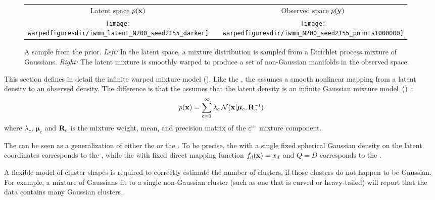 \begin{figure}
\centering
\begin{tabular}{ccc}
Latent space $p({\bf{x}})$ & & Observed space $p({\bf{y}})$ \\
\fbox{\texttt{[image: \\warpedfiguresdir/iwmm\_latent\_N200\_seed2155\_darker]}} &
\raisebox{7em}{$\overset{ \textstyle \vf(\vx)}{ \mathlarger{\mathlarger{\mathlarger{\mathlarger{\mathlarger{ \rightarrow}}}}}}$} &
\fbox{\texttt{[image: \\warpedfiguresdir/iwmm\_N200\_seed2155\_points1000000]}}
\end{tabular}
\caption[A draw from the infinite warped mixture model prior]{
A sample from the \iwmm{} prior.
\emph{Left:} In the latent space, a mixture distribution is sampled from a Dirichlet process mixture of Gaussians.
\emph{Right:} The latent mixture is smoothly warped to produce a set of non-Gaussian manifolds in the observed space.}
\label{fig:generative}
\end{figure}


This section defines in detail the infinite warped mixture model (\iwmm{}).
Like the \gplvm{}, the \iwmm{} assumes a smooth nonlinear mapping from a latent density to an observed density.
The difference is that the \iwmm{} assumes that the latent density is an infinite Gaussian mixture model~(\iGMM{})~\citep{rasmussen2000infinite}:
%
\begin{align}
p(\vx ) = \sum_{c=1}^{\infty} \lambda_c \, {\cal N}(\vx|\bm{\mu}_{c},\vR_{c}\inv)
\end{align}
%
where $\lambda_{c}$, $\bm{\mu}_{c}$ and $\mathbf{R}_{c}$ is the mixture weight, mean, and precision matrix of the $c^{\text{\tiny th}}$ mixture component.

The \iwmm{} can be seen as a generalization of either the \gplvm{} or the \iGMM{}.
To be precise, the \iwmm{} with a single fixed spherical Gaussian density on the latent coordinates corresponds to the \gplvm{}, while the \iwmm{} with fixed direct mapping function $f_{d}({\bf{x}})=x_{d}$ and 
$Q=D$ corresponds to the \iGMM{}.

A flexible model of cluster shapes is required to correctly estimate the number of clusters, if those clusters do not happen to be Gaussian.
For example, a mixture of Gaussians fit to a single non-Gaussian cluster (such as one that is curved or heavy-tailed) will report that the data contains many Gaussian clusters.





